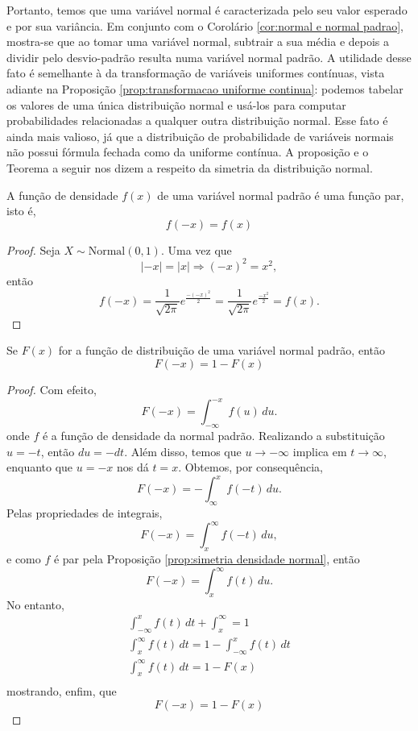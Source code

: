 Portanto, temos que uma variável normal é caracterizada pelo seu valor esperado e por
sua variância.
Em conjunto com o Corolário \ref{cor:normal e normal padrao}, mostra-se que ao tomar
uma variável normal, subtrair a sua média e depois a dividir pelo desvio-padrão resulta
numa variável normal padrão.
A utilidade desse fato é semelhante à da transformação de variáveis uniformes
contínuas, vista adiante na Proposição \ref{prop:transformacao uniforme continua}: podemos tabelar os valores de uma única distribuição normal e usá-los para
computar probabilidades relacionadas a qualquer outra distribuição normal.
Esse fato é ainda mais valioso, já que a distribuição de probabilidade de variáveis
normais não possui fórmula fechada como da uniforme contínua.
A proposição e o Teorema a seguir nos dizem a respeito da simetria da distribuição normal.

\begin{prop:simetria densidade normal}
\label{prop:simetria densidade normal}
A função de densidade $f(x)$ de uma variável normal padrão é uma função par, isto é,
\[
    f(-x) = f(x)
\]
\end{prop:simetria densidade normal}
\begin{proof}
	Seja $X \sim \mathrm{Normal}(0, 1)$.
	Uma vez que
	\[
	    | - x | = | x | \Longrightarrow (-x)^2 = x^2,
	\]
	então
	\[
	    f(-x) = \frac{1}{\sqrt{2\pi}} e^{\frac{-(-x)^2}{2}} =
		\frac{1}{\sqrt{2\pi}} e^{\frac{-x^2}{2}} = f(x).
	\]
\end{proof}

\begin{thm:simetria distribuicao normal}
Se $F(x)$ for a função de distribuição de uma variável normal padrão, então
\[
    F(-x) = 1 - F(x)
\]
\end{thm:simetria distribuicao normal}
\begin{proof}
Com efeito,
\[
    F(-x) = \int_{-\infty}^{-x} f(u)\,du.
\]
onde $f$ é a função de densidade da normal padrão.
Realizando a substituição $u = -t$, então $du = -dt$.
Além disso, temos que $u \to -\infty$ implica em $t \to \infty$, enquanto que
$u = -x$ nos dá $t = x$.
Obtemos, por consequência,
\[
    F(-x) = - \int_{\infty}^{x} f(-t)\,du.
\]
Pelas propriedades de integrais,
\[
    F(-x) = \int_{x}^{\infty} f(-t)\,du,
\]
e como $f$ é par pela Proposição \ref{prop:simetria densidade normal}, então
\[
    F(-x) = \int_{x}^{\infty} f(t)\,du.
\]
No entanto,
\begin{gather*}
	\int_{-\infty}^x f(t)\,dt + \int_{x}^\infty  = 1 \\
	\int_{x}^\infty f(t)\,dt = 1 - \int_{-\infty}^x f(t)\,dt\\
	\int_{x}^\infty f(t)\,dt = 1 - F(x)\\
\end{gather*}
mostrando, enfim, que
\[
    F(-x) = 1 - F(x)
\]
\end{proof}


